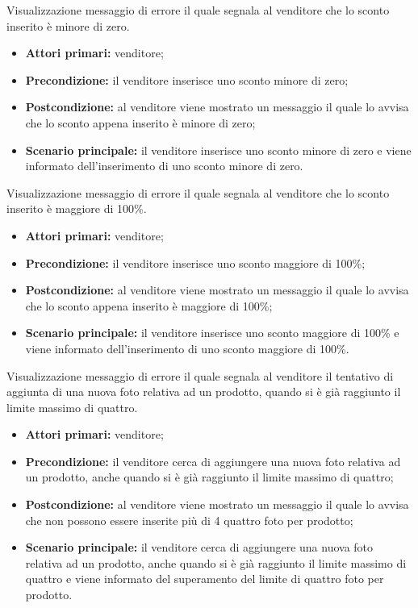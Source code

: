 Visualizzazione messaggio di errore il quale segnala al venditore che lo sconto inserito è minore di zero.
\begin{itemize}
    \item \textbf{Attori primari:} venditore;
    \item \textbf{Precondizione:} il venditore inserisce uno sconto minore di zero;
    \item \textbf{Postcondizione:} al venditore viene mostrato un messaggio il quale lo avvisa che lo sconto appena inserito è minore di zero;
    \item \textbf{Scenario principale:} il venditore inserisce uno sconto minore di zero e viene informato dell'inserimento di uno sconto minore di zero.
\end{itemize}

Visualizzazione messaggio di errore il quale segnala al venditore che lo sconto inserito è maggiore di 100\%.
\begin{itemize}
    \item \textbf{Attori primari:} venditore;
    \item \textbf{Precondizione:} il venditore inserisce uno sconto maggiore di 100\%;
    \item \textbf{Postcondizione:} al venditore viene mostrato un messaggio il quale lo avvisa che lo sconto appena inserito è maggiore di 100\%;
    \item \textbf{Scenario principale:} il venditore inserisce uno sconto maggiore di 100\% e viene informato dell'inserimento di uno sconto maggiore di 100\%.
\end{itemize}

Visualizzazione messaggio di errore il quale segnala al venditore il tentativo di aggiunta di una nuova foto relativa ad un prodotto, quando si è già raggiunto il limite massimo di quattro.
\begin{itemize}
    \item \textbf{Attori primari:} venditore;
    \item \textbf{Precondizione:} il venditore cerca di aggiungere una nuova foto relativa ad un prodotto, anche quando si è già raggiunto il limite massimo di quattro;
    \item \textbf{Postcondizione:} al venditore viene mostrato un messaggio il quale lo avvisa che non possono essere inserite più di 4 quattro foto per prodotto;
    \item \textbf{Scenario principale:} il venditore cerca di aggiungere una nuova foto relativa ad un prodotto, anche quando si è già raggiunto il limite massimo di quattro e viene informato del superamento del limite di quattro foto per prodotto.
\end{itemize}

